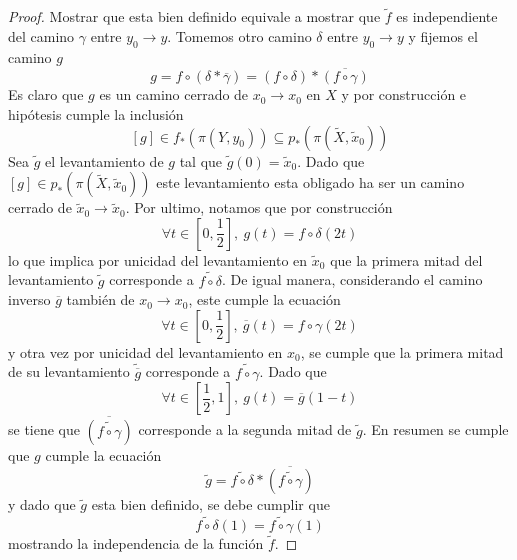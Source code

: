 \begin{proof}
  Mostrar que esta bien definido equivale a mostrar que \(\tilde f\) es
  independiente del camino \(\gamma\) entre \(y_0 \to y\). Tomemos otro
  camino \(\delta\) entre \(y_0 \to y\) y fijemos el camino \(g\)
  \[ g = f \circ \left( \delta * \overline{\gamma} \right)
    = (f \circ \delta) * \overline{(f \circ \gamma)} \]
  Es claro que \(g\) es un camino cerrado de \(x_0 \to x_0\) en \(X\)
  y por construcción e hipótesis cumple la inclusión
  \[ [g] \in f_* \left( \pi (Y, y_0) \right) \subseteq p_* \left( \pi
      (\tilde X, \tilde x_0) \right)\]
  Sea \(\tilde g\) el levantamiento de \(g\) tal que \(\tilde g
  (0) = \tilde x_0\). Dado que \([g] \in p_* \left( \pi (\tilde X
    ,\tilde x_0) \right)\) este levantamiento esta obligado ha ser un
  camino cerrado de \(\tilde x_0 \to \tilde x_0\). Por ultimo, notamos
  que por construcción
  \[ \forall t \in [0, \frac 1 2],\ g(t) = f \circ \delta (2 t) \]
  lo que implica por unicidad del levantamiento en \(\tilde x_0\) que la
  primera mitad del levantamiento \(\tilde g\) corresponde a
  \(\widetilde{f \circ \delta}\). De igual manera, considerando el
  camino inverso \(\overline{g}\) también de \(x_0 \to x_0\), este
  cumple la ecuación
  \[ \forall t \in [0, \frac 1 2],\ \overline{g}(t) = f \circ \gamma (2
    t) \]
  y otra vez por unicidad del levantamiento en \(x_0\), se cumple que la
  primera mitad de su levantamiento \(\widetilde{\overline{g}}\)
  corresponde a \(\widetilde{f \circ \gamma}\). Dado que
  \[ \forall t \in [\frac 1 2 , 1],\ g(t) = \overline{g} (1 - t) \]
  se tiene que \(\overline{(\widetilde{f \circ \gamma})}\) corresponde a la
  segunda mitad de \(\tilde g\). En resumen se cumple que \(g\) cumple
  la ecuación
  \[ \tilde g = \widetilde{f \circ \delta} * \overline{(\widetilde{f
  \circ \gamma})} \] y dado que \(\tilde g\) esta bien definido, se debe
  cumplir que
  \[ \widetilde{f \circ \delta} (1) = \widetilde{f \circ \gamma} (1) \]
  mostrando la independencia de la función \(\tilde f\).


\end{proof}
